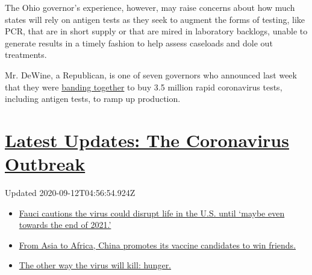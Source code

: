 The Ohio governor's experience, however, may raise concerns about how
much states will rely on antigen tests as they seek to augment the forms
of testing, like PCR, that are in short supply or that are mired in
laboratory backlogs, unable to generate results in a timely fashion to
help assess caseloads and dole out treatments.

Mr. DeWine, a Republican, is one of seven governors who announced last
week that they were
\href{https://governor.maryland.gov/2020/08/04/governors-of-maryland-louisiana-massachusetts-michigan-ohio-and-virginia-announce-major-bipartisan-interstate-compact-for-three-million-rapid-antigen-tests/}{banding
together} to buy 3.5 million rapid coronavirus tests, including antigen
tests, to ramp up production.

\hypertarget{latest-updates-the-coronavirus-outbreak}{%
\section{\texorpdfstring{\href{https://www.nytimes3xbfgragh.onion/2020/09/11/world/covid-19-coronavirus.html?action=click\&pgtype=Article\&state=default\&region=MAIN_CONTENT_1\&context=storylines_live_updates}{Latest
Updates: The Coronavirus
Outbreak}}{Latest Updates: The Coronavirus Outbreak}}\label{latest-updates-the-coronavirus-outbreak}}

Updated 2020-09-12T04:56:54.924Z

\begin{itemize}
\tightlist
\item
  \href{https://www.nytimes3xbfgragh.onion/2020/09/11/world/covid-19-coronavirus.html?action=click\&pgtype=Article\&state=default\&region=MAIN_CONTENT_1\&context=storylines_live_updates\#link-dfb8a16}{Fauci
  cautions the virus could disrupt life in the U.S. until `maybe even
  towards the end of 2021.'}
\item
  \href{https://www.nytimes3xbfgragh.onion/2020/09/11/world/covid-19-coronavirus.html?action=click\&pgtype=Article\&state=default\&region=MAIN_CONTENT_1\&context=storylines_live_updates\#link-7104d154}{From
  Asia to Africa, China promotes its vaccine candidates to win friends.}
\item
  \href{https://www.nytimes3xbfgragh.onion/2020/09/11/world/covid-19-coronavirus.html?action=click\&pgtype=Article\&state=default\&region=MAIN_CONTENT_1\&context=storylines_live_updates\#link-393ad215}{The
  other way the virus will kill: hunger.}
\end{itemize}

